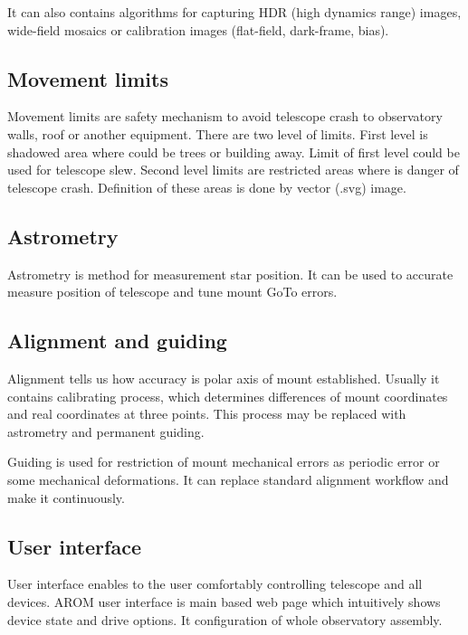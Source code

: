 \documentclass{poster16}
\begin{document}
It can also contains algorithms for capturing HDR (high dynamics range) images, wide-field mosaics or calibration images (flat-field, dark-frame, bias).

\subsection{Movement limits}
Movement limits are safety mechanism to avoid telescope crash to observatory walls, roof or another equipment. There are two level of limits. First level is shadowed area where could be trees or building away. Limit of first level could be used for telescope slew. Second level limits are restricted areas where is danger of telescope crash.
Definition of these areas is done by vector (.svg) image. 

\subsection{Astrometry}
Astrometry is method for measurement star position. It can be used to accurate measure position of telescope and tune mount GoTo errors.

\subsection{Alignment and guiding}
Alignment tells us how accuracy is polar axis of mount established. Usually it contains calibrating process, which determines differences of mount coordinates and real coordinates at three points. This process may be replaced with astrometry and permanent guiding. 

Guiding is used for restriction of mount mechanical errors as periodic error or some mechanical deformations. It can replace standard alignment workflow and make it continuously.

\subsection{User interface}
User interface enables to the user comfortably controlling telescope and all devices. AROM user interface is main based web page which intuitively shows device state and drive options. It configuration of whole observatory assembly.
\end{document}
